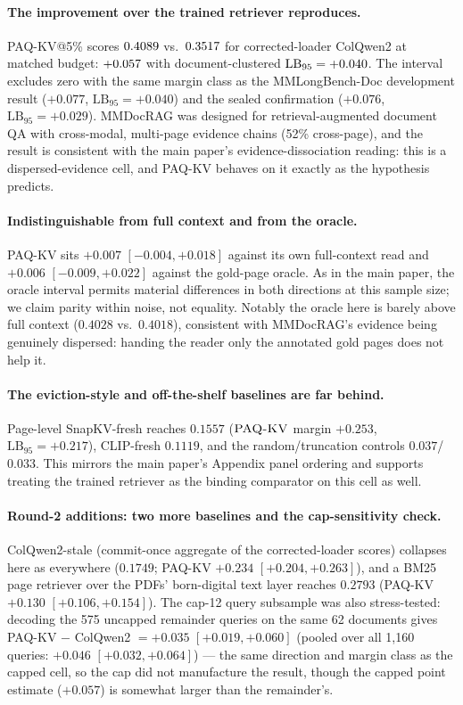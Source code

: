 \documentclass[letterpaper]{article} %
\newcommand{\paqc}{\textsc{PAQ-KV}}
\newcommand{\lb}{\mathrm{LB}_{95}}
\begin{document}
\paragraph{The improvement over the trained retriever reproduces.} \paqc{}@5\% scores $0.4089$ vs.\ $0.3517$ for corrected-loader ColQwen2 at matched budget: $+0.057$ with document-clustered $\lb=\ragLB$. The interval excludes zero with the same margin class as the MMLongBench-Doc development result ($+0.077$, $\lb=+0.040$) and the sealed confirmation ($+0.076$, $\lb=+0.029$). MMDocRAG was designed for retrieval-augmented document QA with cross-modal, multi-page evidence chains (52\% cross-page), and the result is consistent with the main paper's evidence-dissociation reading: this is a dispersed-evidence cell, and \paqc{} behaves on it exactly as the hypothesis predicts.

\paragraph{Indistinguishable from full context and from the oracle.} \paqc{} sits $+0.007$ $[-0.004,+0.018]$ against its own full-context read and $+0.006$ $[-0.009,+0.022]$ against the gold-page oracle. As in the main paper, the oracle interval permits material differences in both directions at this sample size; we claim parity within noise, not equality. Notably the oracle here is barely above full context ($0.4028$ vs.\ $0.4018$), consistent with MMDocRAG's evidence being genuinely dispersed: handing the reader only the annotated gold pages does not help it.

\paragraph{The eviction-style and off-the-shelf baselines are far behind.} Page-level SnapKV-fresh reaches $0.1557$ ($\paqc{}$ margin $+0.253$, $\lb=+0.217$), CLIP-fresh $0.1119$, and the random/truncation controls $0.037$/$0.033$. This mirrors the main paper's Appendix panel ordering and supports treating the trained retriever as the binding comparator on this cell as well.

\paragraph{Round-2 additions: two more baselines and the cap-sensitivity check.} ColQwen2-stale (commit-once aggregate of the corrected-loader scores) collapses here as everywhere ($0.1749$; \paqc{} $+0.234$ $[+0.204,+0.263]$), and a BM25 page retriever over the PDFs' born-digital text layer reaches $0.2793$ (\paqc{} $+0.130$ $[+0.106,+0.154]$). The cap-12 query subsample was also stress-tested: decoding the 575 uncapped remainder queries on the same 62 documents gives \paqc{} $-$ ColQwen2 $= +0.035$ $[+0.019,+0.060]$ (pooled over all 1{,}160 queries: $+0.046$ $[+0.032,+0.064]$) --- the same direction and margin class as the capped cell, so the cap did not manufacture the result, though the capped point estimate ($+0.057$) is somewhat larger than the remainder's.
\end{document}
